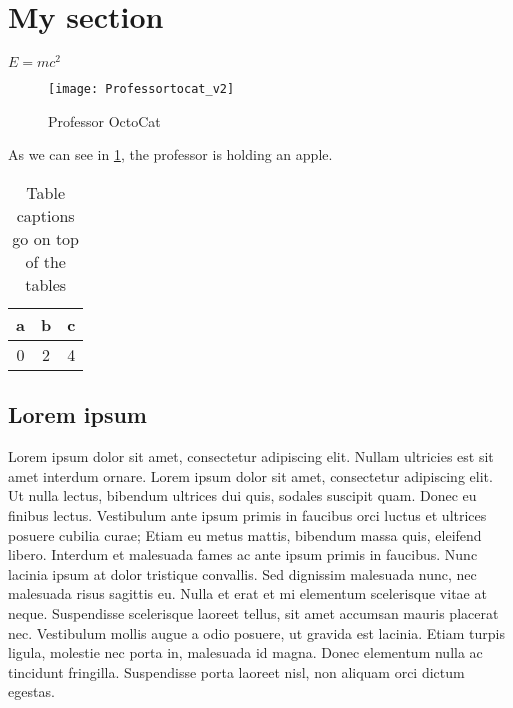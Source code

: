 
\section{My section}%
\label{sec:my_section}

\(E = mc^2\) \cite{einstein}

\begin{figure}[H]
    \centering
    \texttt{[image: Professortocat\_v2]}
    \caption{Professor OctoCat}%
    \label{fig:profocto}
\end{figure}

As we can see in \cref{fig:profocto}, the professor is holding an apple.

\begin{table}[H]
    \begin{center}
    \caption{Table captions go on top of the tables}%
    \label{tab:example}
    \begin{tabular}{ccc}
        \toprule
        a & b & c \\
        \midrule
        0 & 2 & 4 \\
        \bottomrule
    \end{tabular}
    \end{center}
\end{table}

\subsection{Lorem ipsum}%
\label{sub:lorem_ipsum}

Lorem ipsum dolor sit amet, consectetur adipiscing elit. Nullam ultricies est sit amet interdum ornare. Lorem ipsum dolor sit amet, consectetur adipiscing elit. Ut nulla lectus, bibendum ultrices dui quis, sodales suscipit quam. Donec eu finibus lectus. Vestibulum ante ipsum primis in faucibus orci luctus et ultrices posuere cubilia curae; Etiam eu metus mattis, bibendum massa quis, eleifend libero. Interdum et malesuada fames ac ante ipsum primis in faucibus. Nunc lacinia ipsum at dolor tristique convallis. Sed dignissim malesuada nunc, nec malesuada risus sagittis eu. Nulla et erat et mi elementum scelerisque vitae at neque. Suspendisse scelerisque laoreet tellus, sit amet accumsan mauris placerat nec. Vestibulum mollis augue a odio posuere, ut gravida est lacinia. Etiam turpis ligula, molestie nec porta in, malesuada id magna. Donec elementum nulla ac tincidunt fringilla. Suspendisse porta laoreet nisl, non aliquam orci dictum egestas.


